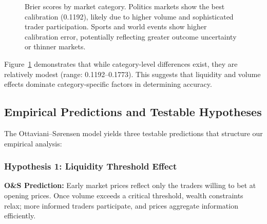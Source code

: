 \documentclass[12pt,letterpaper]{article}
\begin{document}
\begin{figure}[ht]
\centering
{}
\caption{Brier scores by market category. Politics markets show the best calibration (0.1192), likely due to higher volume and sophisticated trader participation. Sports and world events show higher calibration error, potentially reflecting greater outcome uncertainty or thinner markets.}
\label{fig:category}
\end{figure}

Figure~\ref{fig:category} demonstrates that while category-level differences exist, they are relatively modest (range: 0.1192--0.1773). This suggests that liquidity and volume effects dominate category-specific factors in determining accuracy.

\subsection{Empirical Predictions and Testable Hypotheses}

The Ottaviani--S{\o}rensen model yields three testable predictions that structure our empirical analysis:

\subsubsection{Hypothesis 1: Liquidity Threshold Effect}

\textbf{O\&S Prediction:} Early market prices reflect only the traders willing to bet at opening prices. Once volume exceeds a critical threshold, wealth constraints relax; more informed traders participate, and prices aggregate information efficiently.
\end{document}
